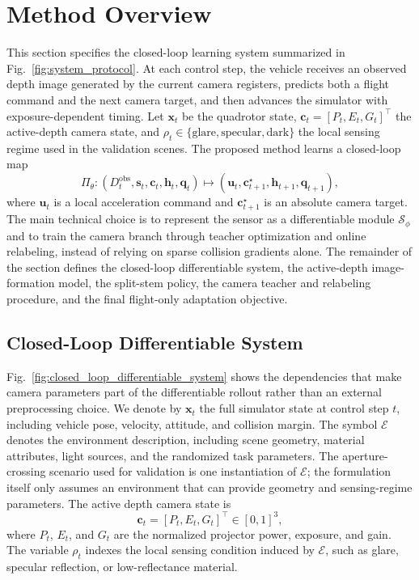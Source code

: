 \documentclass[letterpaper,journal]{IEEEtran}
\begin{document}
\section{Method Overview}
This section specifies the closed-loop learning system summarized in
Fig.~\ref{fig:system_protocol}. At each control step, the vehicle receives an
observed depth image generated by the current camera registers, predicts both
a flight command and the next camera target, and then advances the simulator
with exposure-dependent timing. Let $\mathbf{x}_t$ be the quadrotor state,
$\mathbf{c}_t=[P_t,E_t,G_t]^\top$ the active-depth camera state, and
$\rho_t\in\{\mathrm{glare},\mathrm{specular},\mathrm{dark}\}$ the local
sensing regime used in the validation scenes. The proposed method learns a
closed-loop map
\begin{equation}
    \Pi_\theta:
    (D_t^{\mathrm{obs}},\mathbf{s}_t,\mathbf{c}_t,\mathbf{h}_t,\mathbf{q}_t)
    \mapsto
    (\mathbf{u}_t,\mathbf{c}_{t+1}^{\star},\mathbf{h}_{t+1},\mathbf{q}_{t+1}),
\end{equation}
where $\mathbf{u}_t$ is a local acceleration command and
$\mathbf{c}_{t+1}^{\star}$ is an absolute camera target. The main technical
choice is to represent the sensor as a differentiable module
$\mathcal{S}_{\phi}$ and to train the camera branch through teacher
optimization and online relabeling, instead of relying on sparse collision
gradients alone. The remainder of the section defines the closed-loop
differentiable system, the active-depth image-formation model, the split-stem
policy, the camera teacher and relabeling procedure, and the final
flight-only adaptation objective.

\subsection{Closed-Loop Differentiable System}
Fig.~\ref{fig:closed_loop_differentiable_system} shows the dependencies that
make camera parameters part of the differentiable rollout rather than an
external preprocessing choice.
We denote by $\mathbf{x}_t$ the full simulator state at control step $t$,
including vehicle pose, velocity, attitude, and collision margin. The symbol
$\mathcal{E}$ denotes the environment description, including scene geometry,
material attributes, light sources, and the randomized task parameters. The
aperture-crossing scenario used for validation is one instantiation of
$\mathcal{E}$; the formulation itself only assumes an environment that can
provide geometry and sensing-regime parameters. The active depth camera state
is
\begin{equation}
    \mathbf{c}_t=[P_t,E_t,G_t]^\top\in[0,1]^3,
    \label{eq:camera_state}
\end{equation}
where $P_t$, $E_t$, and $G_t$ are the normalized projector power, exposure,
and gain. The variable $\rho_t$ indexes the local sensing condition induced by
$\mathcal{E}$, such as glare, specular reflection, or low-reflectance material.
\end{document}
